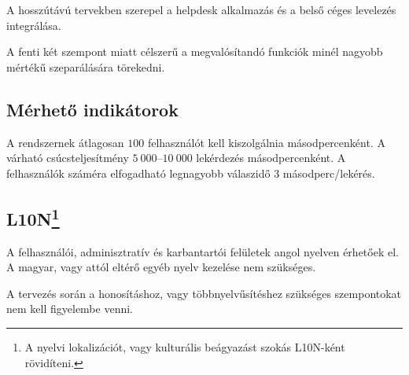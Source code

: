 A hosszútávú tervekben szerepel a \foreignlanguage{british}{helpdesk} alkalmazás és a belső céges levelezés integrálása.

A fenti két szempont miatt célszerű a megvalósítandó funkciók minél nagyobb mértékű szeparálására törekedni.


\subsection{Mérhető indikátorok}\label{sec:indikatorok}
A rendszernek átlagosan $100$ felhasználót kell kiszolgálnia másodpercenként. A várható csúcsteljesítmény $5~000$--$10~000$ lekérdezés másodpercenként. A felhasználók száméra elfogadható legnagyobb válaszidő 3 másodperc/lekérés.


\subsection[L10N]{L10N\footnote{A nyelvi lokalizációt, vagy kulturális beágyazást szokás L10N-ként rövidíteni.}}
A felhasználói, adminisztratív és karbantartói felületek angol nyelven érhetőek el. A magyar, vagy attól eltérő egyéb nyelv kezelése nem szükséges.

A tervezés során a honosításhoz, vagy többnyelvűsítéshez szükséges szempontokat nem kell figyelembe venni.
